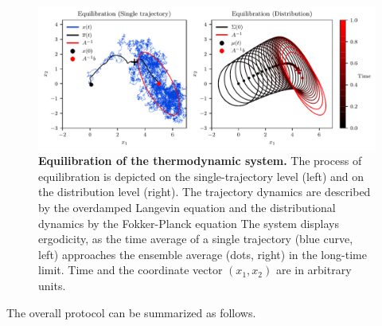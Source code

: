 \documentclass[prx,onecolumn,floatfix,longbibliography,notitlepage, nofootinbib,12pt]{revtex4-2}
\begin{document}
\begin{figure}
    \centering
    \includegraphics[width=0.9\linewidth]{figures/FIG2.pdf}
    \caption{\textbf{Equilibration of the thermodynamic system.} The process of equilibration is depicted on the single-trajectory level (left) and on the distribution level (right). The trajectory dynamics are described by the overdamped Langevin equation and the distributional dynamics by the Fokker-Planck equation \cite{fokker1914mittlere} The system displays ergodicity, as the time average of a single trajectory (blue curve, left) approaches the ensemble average (dots, right) in the long-time limit. Time and the coordinate vector $(x_1,x_2)$ are in arbitrary units.}
    \label{fig:Ergodicity}
\end{figure}


The overall protocol can be summarized as follows.
\end{document}
